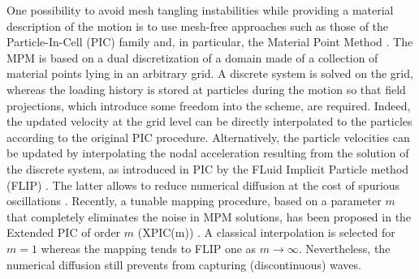 One possibility to avoid mesh tangling instabilities while providing a material description of the motion is to use mesh-free approaches such as those of the Particle-In-Cell (PIC) family \cite{PIC} and, in particular, the Material Point Method \cite{Sulsky94}.
The MPM is based on a dual discretization of a domain made of a collection of material points lying in an arbitrary grid.
A discrete system is solved on the grid, whereas the loading history is stored at particles during the motion so that field projections, which introduce some freedom into the scheme, are required.
%
Indeed, the updated velocity at the grid level can be directly interpolated to the particles according to the original PIC procedure.
Alternatively, the particle velocities can be updated by interpolating the nodal acceleration resulting from the solution of the discrete system, as introduced in PIC by the FLuid Implicit Particle method (FLIP) \cite{FLIP}.
The latter allows to reduce numerical diffusion at the cost of spurious oscillations \cite{PIC_Nishiguchi}.
Recently, a tunable mapping procedure, based on a parameter $m$ that completely eliminates the noise in MPM solutions, has been proposed in the Extended PIC of order $m$ (XPIC(m)) \cite{XPIC}.
A classical interpolation is selected for $m=1$ whereas the mapping tends to FLIP one as $m\rightarrow \infty$.
Nevertheless, the numerical diffusion still prevents from capturing (discontinuous) waves.

